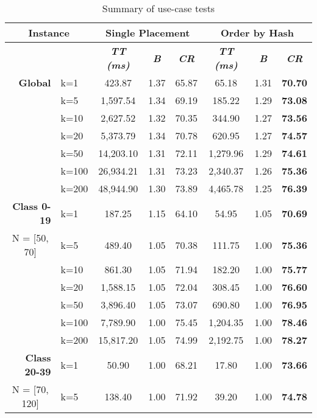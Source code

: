 \begin{table}[htbp]
    \caption{Summary of use-case tests}
    \begin{tabular}{|l|l|c|c|c|c|c|c|}
    \hline
    \multicolumn{ 2}{|c|}{\textbf{Instance}} & \multicolumn{ 3}{c|}{\textbf{Single Placement}} & \multicolumn{ 3}{c|}{\textbf{Order by Hash}} \\ \hline
    \multicolumn{ 2}{|l|}{} & \textbf{\textit{TT (ms)}} & \textbf{\textit{B}} & \textbf{\textit{CR}} & \textbf{\textit{TT (ms)}} & \textbf{\textit{B}} & \textbf{\textit{CR}} \\ \hline
    \multicolumn{1}{|r|}{\textbf{Global}} & k=1 & 423.87 & 1.37 & 65.87 & 65.18 & 1.31 & \textbf{70.70} \\ 
     & k=5 & 1,597.54 & 1.34 & 69.19 & 185.22 & 1.29 & \textbf{73.08} \\ 
     & k=10 & 2,627.52 & 1.32 & 70.35 & 344.90 & 1.27 & \textbf{73.56} \\ 
     & k=20 & 5,373.79 & 1.34 & 70.78 & 620.95 & 1.27 & \textbf{74.57} \\ 
     & k=50 & 14,203.10 & 1.31 & 72.11 & 1,279.96 & 1.29 & \textbf{74.61} \\ 
     & k=100 & 26,934.21 & 1.31 & 73.23 & 2,340.37 & 1.26 & \textbf{75.36} \\ 
     & k=200 & 48,944.90 & 1.30 & 73.89 & 4,465.78 & 1.25 & \textbf{76.39} \\ \hline
    \multicolumn{1}{|r|}{\textbf{Class 0-19}} & k=1 & 187.25 & 1.15 & 64.10 & 54.95 & 1.05 & \textbf{70.69} \\ 
    \multicolumn{1}{|c|}{N = [50, 70]} & k=5 & 489.40 & 1.05 & 70.38 & 111.75 & 1.00 & \textbf{75.36} \\ 
     & k=10 & 861.30 & 1.05 & 71.94 & 182.20 & 1.00 & \textbf{75.77} \\ 
     & k=20 & 1,588.15 & 1.05 & 72.04 & 308.45 & 1.00 & \textbf{76.60} \\ 
     & k=50 & 3,896.40 & 1.05 & 73.07 & 690.80 & 1.00 & \textbf{76.95} \\ 
     & k=100 & 7,789.90 & 1.00 & 75.45 & 1,204.35 & 1.00 & \textbf{78.46} \\ 
     & k=200 & 15,817.20 & 1.05 & 74.99 & 2,192.75 & 1.00 & \textbf{78.27} \\ \hline
    \multicolumn{1}{|r|}{\textbf{Class 20-39}} & k=1 & 50.90 & 1.00 & 68.21 & 17.80 & 1.00 & \textbf{73.66} \\ 
    \multicolumn{1}{|c|}{N = [70, 120]} & k=5 & 138.40 & 1.00 & 71.92 & 39.20 & 1.00 & \textbf{74.78} \\ 

\end{tabular}
\end{table}
